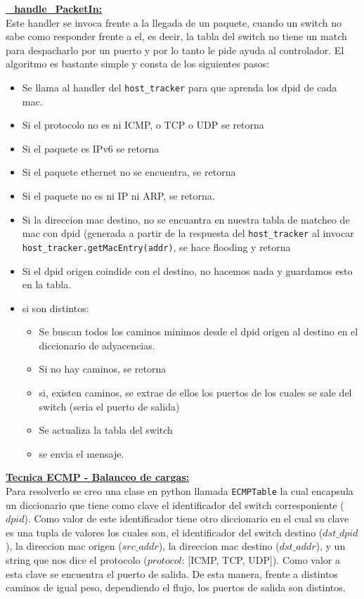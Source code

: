 	\underline{\textbf{\_handle\_PacketIn:}}\\
		Este handler se invoca frente a la llegada de un paquete, cuando un switch no sabe como responder frente a el, es decir, la 			tabla del switch no tiene un match para despacharlo por un puerto y por lo tanto le pide ayuda al controlador. El algoritmo 			es bastante simple y consta de los siguientes pasos:
		\begin{itemize}
			\item Se llama al handler del \lstinline[columns=fixed]{host_tracker} para que aprenda los dpid de cada mac.
			\item Si el protocolo no es ni ICMP, o TCP o UDP se retorna
			\item Si el paquete es IPv6 se retorna
			\item Si el paquete ethernet no se encuentra, se retorna
			\item Si el paquete no es ni IP ni ARP, se retorna.
			\item Si la direccion mac destino, no se encuantra en nuestra tabla de matcheo de mac con dpid (generada a partir de la 			respuesta del \lstinline[columns=fixed]{host_tracker} al invocar 
			\lstinline[columns=fixed]{host_tracker.getMacEntry(addr)}, se hace flooding y retorna
			\item Si el dpid origen coindide con el destino, no hacemos nada y guardamos esto en la tabla.
			\item si son distintos:
			\begin{itemize}
				\item Se buscan todos los caminos minimos desde el dpid origen al destino en el diccionario de adyacencias.
				\item Si no hay caminos, se retorna
				\item si, existen caminos, se extrae de ellos los puertos de los cuales se sale del switch (seria el puerto de 					salida)
				\item Se actualiza la tabla del switch
				\item se envia el mensaje.
			\end{itemize}
		\end{itemize}
	\underline{\textbf{Tecnica ECMP - Balanceo de cargas:}}\\
		Para resolverlo se creo una clase en python llamada \lstinline[columns=fixed]{ECMPTable} la cual encapsula un diccionario que 			tiene como clave el identificador del switch corresponiente ($dpid$). Como valor de este identificador tiene otro diccionario 			en el cual su clave es una tupla de valores los cuales son, el identificador del switch destino ($dst\_dpid$), la direccion mac 		origen ($src\_addr$), la direccion mac destino ($dst\_addr$), y un string que nos dice el protocolo ($protocol$: [ICMP, TCP, 			UDP]). Como valor a esta clave se encuentra el puerto de salida. De esta manera, frente a distintos caminos de igual peso, 			dependiendo el flujo, los puertos de salida son distintos.

